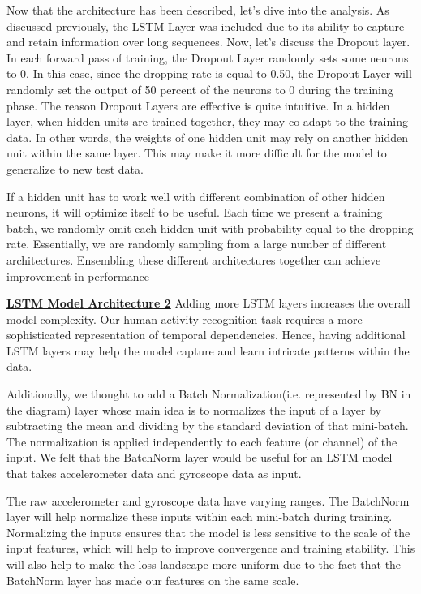 \documentclass[conference]{IEEEtran}
\begin{document}
Now that the architecture has been described, let's dive into the analysis. As discussed previously, the LSTM Layer was included due to its ability to capture and retain information over long sequences. Now, let's discuss the Dropout layer. In each forward pass of training, the Dropout Layer randomly sets some neurons to 0. In this case, since the dropping rate is equal to 0.50, the Dropout Layer will randomly set the output of 50 percent of the neurons to 0 during the training phase. The reason Dropout Layers are effective is quite intuitive. In a hidden layer, when hidden units are trained together, they may co-adapt to the training data. In other words, the weights of one hidden unit may rely on another hidden unit within the same layer. This may make it more difficult for the model to generalize to new test data. \newline 

If a hidden unit has to work well with different combination of other hidden neurons, it will optimize itself to be useful. Each time we present a training batch, we randomly omit each hidden unit with probability equal to the dropping rate. Essentially, we are randomly sampling from a large number of different architectures. Ensembling these different architectures together can achieve improvement in performance \newline 

 
\textbf{\underline{LSTM Model Architecture 2}} \newline 
Adding more LSTM layers increases the overall model complexity. Our human activity recognition task requires a more sophisticated representation of temporal dependencies. Hence, having additional LSTM layers may help the model capture and learn intricate patterns within the data. \newline 

Additionally, we thought to add a Batch Normalization(i.e. represented by BN in the diagram) layer whose main idea is to normalizes the input of a layer by subtracting the mean and dividing by the standard deviation of that mini-batch. The normalization is applied independently to each feature (or channel) of the input. We felt that the BatchNorm layer would be useful for an LSTM model that takes accelerometer data and gyroscope data as input. \newline 

The raw accelerometer and gyroscope data have varying ranges. The BatchNorm layer will help normalize these inputs within each mini-batch during training. Normalizing the inputs ensures that the model is less sensitive to the scale of the input features, which will help to improve convergence and training stability. This will also help to make the loss landscape more uniform due to the fact that the BatchNorm layer has made our features on the same scale. \newline 
\end{document}
